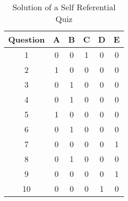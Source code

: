 \begin{table}[ht]
\caption{\label{srq-solution-table}Solution of a Self Referential Quiz}
\begin{center}
\begin{tabular}{|c|c|c|c|c|c|}
\hline Question & A & B & C & D & E \\
\hline\hline 1 & 0 & 0 & 1 & 0 & 0 \\
\hline 2 & 1 & 0 & 0 & 0 & 0 \\
\hline 3 & 0 & 1 & 0 & 0 & 0 \\
\hline 4 & 0 & 1 & 0 & 0 & 0 \\
\hline 5 & 1 & 0 & 0 & 0 & 0 \\
\hline 6 & 0 & 1 & 0 & 0 & 0 \\
\hline 7 & 0 & 0 & 0 & 0 & 1 \\
\hline 8 & 0 & 1 & 0 & 0 & 0 \\
\hline 9 & 0 & 0 & 0 & 0 & 1 \\
\hline 10 & 0 & 0 & 0 & 1 & 0 \\
\hline 
\end{tabular}
\end{center}
\end{table}

